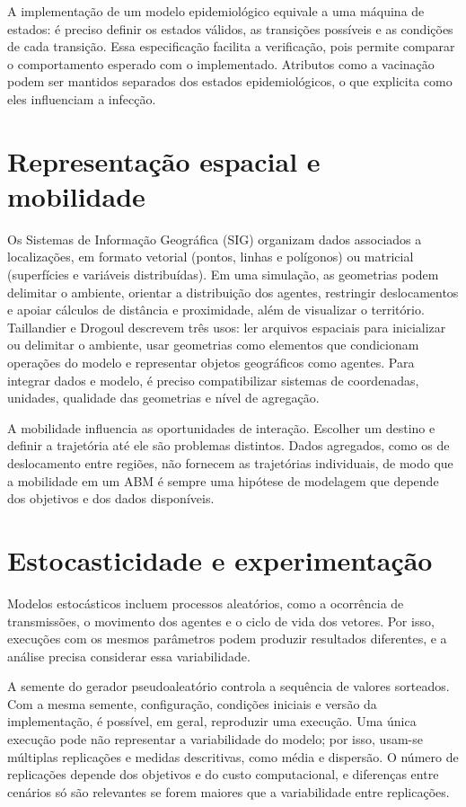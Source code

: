 A implementação de um modelo epidemiológico equivale a uma máquina de estados: é preciso definir os estados válidos, as transições possíveis e as condições de cada transição. Essa especificação facilita a verificação, pois permite comparar o comportamento esperado com o implementado. Atributos como a vacinação podem ser mantidos separados dos estados epidemiológicos, o que explicita como eles influenciam a infecção.

\section{Representação espacial e mobilidade}

Os Sistemas de Informação Geográfica (SIG) organizam dados associados a localizações, em formato vetorial (pontos, linhas e polígonos) ou matricial (superfícies e variáveis distribuídas). Em uma simulação, as geometrias podem delimitar o ambiente, orientar a distribuição dos agentes, restringir deslocamentos e apoiar cálculos de distância e proximidade, além de visualizar o território. Taillandier e Drogoul \cite{taillandier_drogoul_2010} descrevem três usos: ler arquivos espaciais para inicializar ou delimitar o ambiente, usar geometrias como elementos que condicionam operações do modelo e representar objetos geográficos como agentes. Para integrar dados e modelo, é preciso compatibilizar sistemas de coordenadas, unidades, qualidade das geometrias e nível de agregação.

A mobilidade influencia as oportunidades de interação. Escolher um destino e definir a trajetória até ele são problemas distintos. Dados agregados, como os de deslocamento entre regiões, não fornecem as trajetórias individuais, de modo que a mobilidade em um ABM é sempre uma hipótese de modelagem que depende dos objetivos e dos dados disponíveis.

\section{Estocasticidade e experimentação}

Modelos estocásticos incluem processos aleatórios, como a ocorrência de transmissões, o movimento dos agentes e o ciclo de vida dos vetores. Por isso, execuções com os mesmos parâmetros podem produzir resultados diferentes, e a análise precisa considerar essa variabilidade.

A semente do gerador pseudoaleatório controla a sequência de valores sorteados. Com a mesma semente, configuração, condições iniciais e versão da implementação, é possível, em geral, reproduzir uma execução. Uma única execução pode não representar a variabilidade do modelo; por isso, usam-se múltiplas replicações e medidas descritivas, como média e dispersão. O número de replicações depende dos objetivos e do custo computacional, e diferenças entre cenários só são relevantes se forem maiores que a variabilidade entre replicações.

